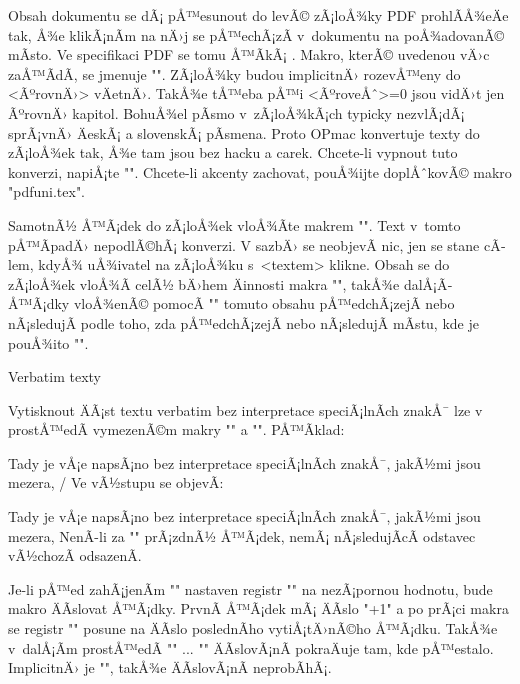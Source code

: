 Obsah dokumentu se dÃ¡ pÅ™esunout do levÃ© zÃ¡loÅ¾ky PDF prohlÃ­Å¾eÄe tak, Å¾e klikÃ¡nÃ­m na
nÄ›j se pÅ™echÃ¡zÃ­ v~dokumentu na poÅ¾adovanÃ© mÃ­sto. Ve specifikaci PDF se tomu
Å™Ã­kÃ¡ . Makro, kterÃ© uvedenou vÄ›c zaÅ™Ã­dÃ­, se jmenuje
"". ZÃ¡loÅ¾ky budou implicitnÄ› rozevÅ™eny do <ÃºrovnÄ›>
vÄetnÄ›. TakÅ¾e tÅ™eba pÅ™i <ÃºroveÅˆ>=0 jsou
vidÄ›t jen ÃºrovnÄ› kapitol. BohuÅ¾el pÃ­smo v~zÃ¡loÅ¾kÃ¡ch typicky
nezvlÃ¡dÃ¡ sprÃ¡vnÄ› ÄeskÃ¡ a slovenskÃ¡ pÃ­smena. 
Proto OPmac konvertuje texty do
zÃ¡loÅ¾ek tak, Å¾e tam jsou bez hacku a carek.
Chcete-li vypnout tuto konverzi, napiÅ¡te "\def\toasciidata{}".
Chcete-li akcenty zachovat, pouÅ¾ijte doplÅˆkovÃ© makro "pdfuni.tex".

SamotnÃ½ Å™Ã¡dek do zÃ¡loÅ¾ek vloÅ¾Ã­te makrem
"". Text v~tomto pÅ™Ã­padÄ› nepodlÃ©hÃ¡ konverzi.
V sazbÄ› se neobjevÃ­ nic, jen se stane cÃ­lem, kdyÅ¾ uÅ¾ivatel na zÃ¡loÅ¾ku
s~<textem> klikne. Obsah se do zÃ¡loÅ¾ek vloÅ¾Ã­ celÃ½ bÄ›hem Äinnosti makra
"\outlines", takÅ¾e dalÅ¡Ã­ Å™Ã¡dky vloÅ¾enÃ© pomocÃ­ "\insertoutline" tomuto
obsahu pÅ™edchÃ¡zejÃ­ nebo nÃ¡sledujÃ­ podle toho, zda pÅ™edchÃ¡zejÃ­ nebo nÃ¡sledujÃ­
mÃ­stu, kde je pouÅ¾ito "\outlines".


\sec Verbatim texty

Vytisknout ÄÃ¡st textu verbatim  bez interpretace 
speciÃ¡lnÃ­ch znakÅ¯ lze
v prostÅ™edÃ­ vymezenÃ©m makry "\begtt" a "\endtt". PÅ™Ã­klad:

{\def\tthook{\adef/{\string\endtt}}
\begtt
\begtt
Tady je vÅ¡e
   napsÃ¡no bez   interpretace speciÃ¡lnÃ­ch znakÅ¯, jakÃ½mi
 jsou mezera, %
/
\endtt
}
Ve vÃ½stupu se objevÃ­:

\begtt
Tady je vÅ¡e
   napsÃ¡no bez   interpretace speciÃ¡lnÃ­ch znakÅ¯, jakÃ½mi
 jsou mezera, %
\endtt
%
NenÃ­-li za "\endtt" prÃ¡zdnÃ½ Å™Ã¡dek, nemÃ¡ nÃ¡sledujÃ­cÃ­ odstavec vÃ½chozÃ­
odsazenÃ­. 

Je-li pÅ™ed zahÃ¡jenÃ­m "\begtt" nastaven registr "\ttline" na nezÃ¡pornou
hodnotu, bude makro ÄÃ­slovat Å™Ã¡dky. PrvnÃ­ Å™Ã¡dek mÃ¡ ÄÃ­slo "\ttline+1"
a po prÃ¡ci makra se registr "\ttline" posune na ÄÃ­slo poslednÃ­ho
vytiÅ¡tÄ›nÃ©ho Å™Ã¡dku. TakÅ¾e v~dalÅ¡Ã­m prostÅ™edÃ­ "\begtt" ... "\endtt" 
ÄÃ­slovÃ¡nÃ­ pokraÄuje tam, kde pÅ™estalo. ImplicitnÄ› je "",
takÅ¾e ÄÃ­slovÃ¡nÃ­ neprobÃ­hÃ¡.

